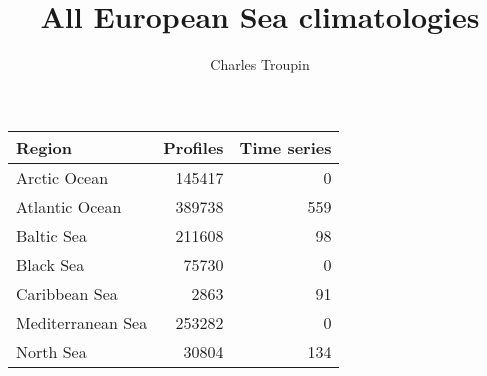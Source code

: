 \documentclass[10pt,a4paper,final,oneside]{article}
\author{Charles Troupin}
\title{All European Sea climatologies}
\begin{document}
\begin{table}
\begin{tabularx}{\textwidth}{Xrr}
\toprule
Region			& Profiles		& Time series	\\
\midrule
Arctic Ocean		& 145417			& 0				\\
Atlantic	 Ocean	& 389738			& 559			\\
Baltic Sea		& 211608			& 98				\\
Black Sea		& 75730			& 0				\\
Caribbean Sea	& 2863			& 91				\\
Mediterranean Sea & 253282		& 0				\\
North Sea		& 30804			& 134			\\
\bottomrule
\end{tabularx}
\end{table}
\end{document}
